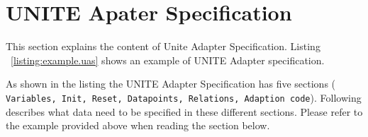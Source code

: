 \section{UNITE Apater Specification}
\label{sec:unite-uas}

This section explains the content of Unite Adapter Specification. Listing
~\ref{listing:example.uas} shows an example of UNITE Adapter specification. 




As shown in the listing the UNITE Adapter Specification has five sections (
\texttt{Variables, Init, Reset, Datapoints, Relations, Adaption code}). Following 
describes what data need to be specified in these different sections.
Please refer to the example provided above when reading the section 
below.

